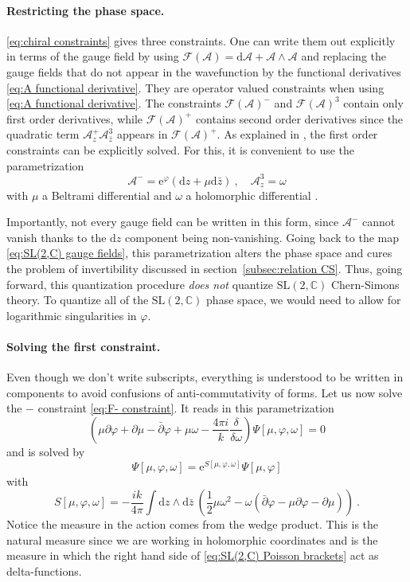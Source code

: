 \documentclass[12pt,a4paper]{article}
\newcommand{\be}{\begin{equation}}
\newcommand{\ee}{\end{equation}}
\newcommand\SL{\text{SL}}
\newcommand\CC{\mathbb{C}}
\renewcommand\d{\text{d}}
\begin{document}
\paragraph{Restricting the phase space.} \eqref{eq:chiral constraints} gives three constraints. One can write them out explicitly in terms of the gauge field by using $\mathcal{F}(\mathcal{A})=\d \mathcal{A}+\mathcal{A} \wedge \mathcal{A}$ and replacing the gauge fields that do not appear in the wavefunction by the functional derivatives \eqref{eq:A functional derivative}. They are operator valued constraints when using \eqref{eq:A functional derivative}. The constraints $\mathcal{F}(\mathcal{A})^-$ and $\mathcal{F}(\mathcal{A})^3$ contain only first order derivatives, while $\mathcal{F}(\mathcal{A})^+$ contains second order derivatives since the quadratic term $\mathcal{A}_z^+ \mathcal{A}_{\bar{z}}^3$ appears in $\mathcal{F}(\mathcal{A})^+$. As explained in \cite{Verlinde:1989ua}, the first order constraints can be explicitly solved. For this, it is convenient to use the parametrization
\be 
\mathcal{A}^-=\mathrm{e}^{\varphi}(\d z+\mu \d \bar{z}) ~, \quad \mathcal{A}_z^3=\omega
\ee
with $\mu$ a Beltrami differential and $\omega$ a holomorphic differential \cite{Moncrief:1989dx, Krasnov:2005dm}.

Importantly, not every gauge field can be written in this form, since $\mathcal{A}^-$ cannot vanish thanks to the $\d z$ component being non-vanishing. Going back to the map \eqref{eq:SL(2,C) gauge fields}, this parametrization alters the phase space and cures the problem of invertibility discussed in section~\ref{subsec:relation CS}. Thus, going forward, this quantization procedure \emph{does not} quantize $\SL(2,\CC)$ Chern-Simons theory. To quantize all of the $\SL(2,\CC)$ phase space, we would need to allow for logarithmic singularities in $\varphi$.

\paragraph{Solving the first constraint.} Even though we don't write subscripts, everything is understood to be written in components to avoid confusions of anti-commutativity of forms.
Let us now solve the $-$ constraint \eqref{eq:F- constraint}. It reads in this parametrization
\be 
\left(\mu \partial \varphi +\partial \mu - \bar{\partial} \varphi+\mu \omega -\frac{4\pi i}{k} \frac{\delta}{\delta \omega}\right)\Psi[\mu,\varphi,\omega]=0
\ee
and is solved by
\be 
\Psi[\mu,\varphi,\omega]=\mathrm{e}^{S[\mu,\varphi,\omega]} \Psi[\mu,\varphi]
\ee
with
\be 
S[\mu,\varphi,\omega]=-\frac{ik}{4\pi}\int \d z \wedge \d \bar{z}\ \left(\frac{1}{2} \mu \omega^2-\omega (\bar{\partial} \varphi-\mu \partial \varphi-\partial \mu)\right) ~.
\ee
Notice the measure in the action comes from the wedge product. This is the natural measure since we are working in holomorphic coordinates and is the measure in which the right hand side of \eqref{eq:SL(2,C) Poisson brackets} act as delta-functions.
\end{document}
